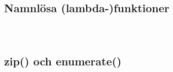 \begin{frame}[fragile]
  \begin{example}
    \inputminted[firstline=3,lastline=15]{python}{examples/filtering.py}
  \end{example}
\end{frame}

\begin{frame}[fragile]
  \begin{example}
    \inputminted[firstline=21]{python}{examples/filtering.py}
  \end{example}
\end{frame}

\subsection{Namnlösa (lambda-)funktioner}

\begin{frame}[fragile]
  \begin{example}
    \inputminted{python}{examples/filter-lambda.py}
  \end{example}
\end{frame}

\begin{frame}[fragile]
  \begin{example}
    \inputminted[firstline=7,lastline=18]{python}{examples/any-all.py}
  \end{example}
\end{frame}

\begin{frame}[fragile]
  \begin{example}
    \inputminted[firstline=20]{python}{examples/any-all.py}
  \end{example}
\end{frame}

\subsection{zip() och enumerate()}

\begin{frame}[fragile]
  \begin{example}[enum.py]
    \inputminted{python}{examples/enum.py}
  \end{example}
\end{frame}

\begin{frame}[fragile]
  \begin{example}[zip.py]
    \inputminted{python}{examples/zip.py}
  \end{example}
\end{frame}

